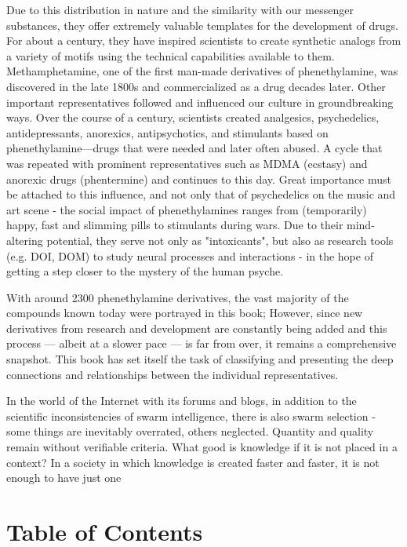 Due to this distribution in nature and the similarity with our messenger substances, they offer extremely valuable templates for the development of drugs. For about a century, they have inspired scientists to create synthetic analogs from a variety of motifs using the technical capabilities available to them. Methamphetamine, one of the first man-made derivatives of phenethylamine, was discovered in the late 1800s and commercialized as a drug decades later. Other important representatives followed and influenced our culture in groundbreaking ways. Over the course of a century, scientists created analgesics, psychedelics, antidepressants, anorexics, antipsychotics, and stimulants based on phenethylamine—drugs that were needed and later often abused. A cycle that was repeated with prominent representatives such as MDMA (ecstasy) and anorexic drugs (phentermine) and continues to this day. Great importance must be attached to this influence, and not only that of psychedelics on the music and art scene - the social impact of phenethylamines ranges from (temporarily) happy, fast and slimming pills to stimulants during wars. Due to their mind-altering potential, they serve not only as "intoxicants", but also as research tools (e.g. DOI, DOM) to study neural processes and interactions - in the hope of getting a step closer to the mystery of the human psyche.

With around 2300 phenethylamine derivatives, the vast majority of the compounds known today were portrayed in this book; However, since new derivatives from research and development are constantly being added and this process — albeit at a slower pace — is far from over, it remains a comprehensive snapshot. This book has set itself the task of classifying and presenting the deep connections and relationships between the individual representatives.

In the world of the Internet with its forums and blogs, in addition to the scientific inconsistencies of swarm intelligence, there is also swarm selection - some things are inevitably overrated, others neglected. Quantity and quality remain without verifiable criteria. What good is knowledge if it is not placed in a context? In a society in which knowledge is created faster and faster, it is not enough to have just one
\clearpage


\clearpage

\section{Table of Contents}

